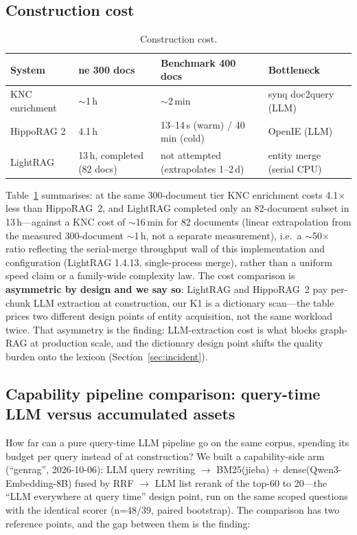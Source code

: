 \documentclass[sigconf,nonacm]{acmart}
\begin{document}
\subsection{Construction cost}

\begin{table}[!t]
\centering
\caption{Construction cost.}
\label{tab:cost}
\small
\begin{tabularx}{\textwidth}{lXXl}
\toprule
System & ne 300 docs & Benchmark 400 docs & Bottleneck \\
\midrule
KNC enrichment & ${\sim}$1\,h & ${\sim}$2\,min & synq doc2query (LLM) \\
HippoRAG 2 & 4.1\,h & 13--14\,s (warm) / 40\,min (cold) & OpenIE (LLM) \\
LightRAG & 13\,h, completed (82 docs) & not attempted (extrapolates 1--2\,d) & entity merge (serial CPU) \\
\bottomrule
\end{tabularx}
\end{table}

Table~\ref{tab:cost} summarises: at the same 300-document tier KNC
enrichment costs 4.1$\times$ less than HippoRAG~2, and LightRAG completed
only an 82-document subset in 13\,h---against a KNC cost of
${\sim}$16\,min for 82 documents (linear extrapolation from the measured
300-document ${\sim}$1\,h, not a separate measurement), i.e.\ a
${\sim}$50$\times$ ratio reflecting the serial-merge throughput wall of
this implementation and configuration (LightRAG 1.4.13, single-process
merge), rather than a uniform speed claim or a family-wide complexity
law. The cost comparison is \textbf{asymmetric by design and we say so}:
LightRAG and HippoRAG~2 pay per-chunk LLM extraction at construction,
our K1 is a dictionary scan---the table prices two different design
points of entity acquisition, not the same workload twice. That
asymmetry is the finding: LLM-extraction cost is what blocks graph-RAG
at production scale, and the dictionary design point shifts the quality
burden onto the lexicon (Section~\ref{sec:incident}).

\subsection{Capability pipeline comparison: query-time LLM versus
accumulated assets}

How far can a pure query-time LLM pipeline go on the same corpus,
spending its budget per query instead of at construction? We built a
capability-side arm (``genrag'', 2026-10-06): LLM query rewriting
$\to$ BM25(jieba) + dense(Qwen3-Embedding-8B) fused by RRF $\to$ LLM
list rerank of the top-60 to 20---the ``LLM everywhere at query time''
design point, run on the same scoped questions with the identical
scorer (n=48/39, paired bootstrap). The comparison has two reference
points, and the gap between them is the finding:
\end{document}
